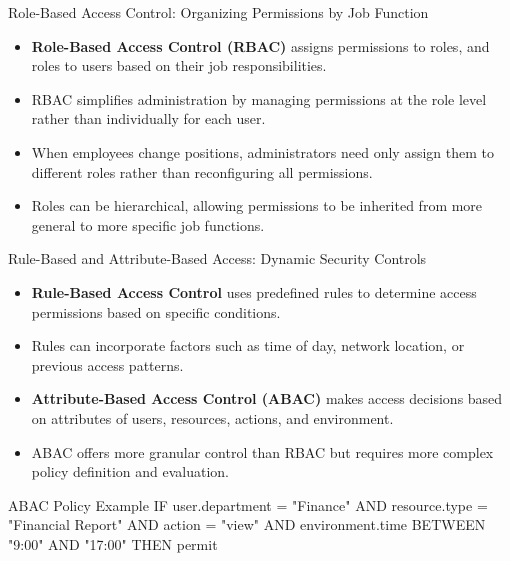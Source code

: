 \documentclass{beamer}
\begin{document}
\begin{frame}{Role-Based Access Control: Organizing Permissions by Job Function}
    \begin{itemize}
        \item \textbf{Role-Based Access Control (RBAC)} assigns permissions to roles, and roles to users based on their job responsibilities.
        \item RBAC simplifies administration by managing permissions at the role level rather than individually for each user.
        \item When employees change positions, administrators need only assign them to different roles rather than reconfiguring all permissions.
        \item Roles can be hierarchical, allowing permissions to be inherited from more general to more specific job functions.
    \end{itemize}
    
    \begin{center}
    \end{center}
\end{frame}

\begin{frame}{Rule-Based and Attribute-Based Access: Dynamic Security Controls}
    \begin{itemize}
        \item \textbf{Rule-Based Access Control} uses predefined rules to determine access permissions based on specific conditions.
        \item Rules can incorporate factors such as time of day, network location, or previous access patterns.
        \item \textbf{Attribute-Based Access Control (ABAC)} makes access decisions based on attributes of users, resources, actions, and environment.
        \item ABAC offers more granular control than RBAC but requires more complex policy definition and evaluation.
    \end{itemize}
    
    \begin{alertblock}{ABAC Policy Example}
        IF user.department = "Finance" AND resource.type = "Financial Report" AND action = "view" AND environment.time BETWEEN "9:00" AND "17:00" THEN permit
    \end{alertblock}
\end{frame}
\end{document}
